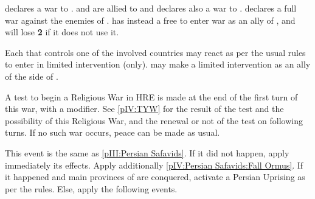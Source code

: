 
\phevnt
\aparag \paysBrandebourg declares a war to \paysBaviere.  \paysSaxe and
\payspalatinat are allied to \paysBrandebourg and declares also a war to
\paysBaviere.
\aparag \AUSMin declares a full war against the enemies of \paysBaviere.
\bparag \AUS has instead a free \CB to enter war as an ally of \paysBaviere,
and will lose {\bf 2} \STAB if it does not use it.

\phdipl
\aparag Each \MAJ that controls one of the involved countries may react as per
the usual rules to enter in limited intervention (only).
\aparag \SPA may make a limited intervention as an ally of the side of
\paysBaviere.

\phpaix
\aparag A test to begin a Religious War in HRE is made at the end of the first
turn of this war, with a  modifier.  See \ref{pIV:TYW} for the
result of the test and the possibility of this Religious War, and the renewal
or not of the test on following turns.  If no such war occurs, peace can be
made as usual.










\condition{}
\aparag This event is the same as \ref{pIII:Persian Safavids}.  If it did not
happen, apply immediately its effects. Apply additionally \ref{pIV:Persian
  Safavids:Fall Ormus}.
\aparag If it happened and main provinces of \paysperse are conquered,
activate a Persian Uprising as per the rules.
\aparag Else, apply the following events.

